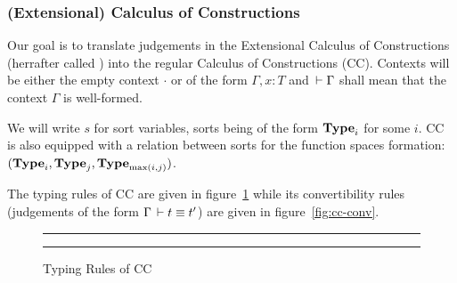 \documentclass[11pt]{article}
\theoremstyle{plain}
\theoremstyle{remark}
\begin{document}
\subsubsection{(Extensional) Calculus of Constructions}

Our goal is to translate judgements in the Extensional Calculus of
Constructions (herrafter called \CCe) into the regular Calculus of Constructions
(CC). Contexts will be either the empty context $\cdot$ or of the form
$\Gamma, x:T$ and $\,\vdash \Gamma$ shall mean that the context $\Gamma$ is
well-formed.

We will write $s$ for sort variables, sorts being of the form $\operatorname{\mathbf{Type}}_i$ for
some $i$. CC is also equipped with a relation between sorts for the function
spaces formation: $(\operatorname{\mathbf{Type}}_i, \operatorname{\mathbf{Type}}_j, \operatorname{\mathbf{Type}}_{\max(i,j)})$.

The typing rules of CC are given in figure~\ref{fig:cc-typ} while its
convertibility rules (judgements of the form $\Gamma \,\vdash t \equiv t'$) are
given in figure~\ref{fig:cc-conv}.

\begin{figure}[h]
  \hrule \vspace*{2ex}%

  \begin{mathc}
    \qquad
    \qquad
  \end{mathc}

  \begin{mathc}
    \qquad
  \end{mathc}

  \begin{mathc}
  \end{mathc}

  \begin{mathc}
    \qquad
  \end{mathc}

  \begin{mathc}
  \end{mathc}

  \hrule%

  \caption{Typing Rules of CC}
  \label{fig:cc-typ}
\end{figure}
\end{document}
